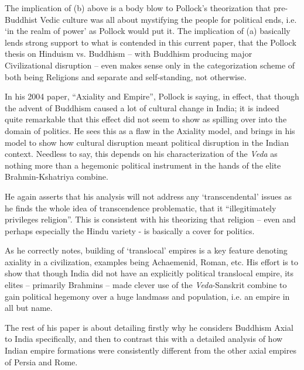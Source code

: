 The implication of (b) above is a body blow to Pollock’s theorization that pre-Buddhist Vedic culture was all about mystifying the people for political ends, i.e. ‘in the realm of power’ as Pollock would put it. The implication of (a) basically lends strong support to what is contended in this current paper, that the Pollock thesis on Hinduism vs. Buddhism – with Buddhism producing major Civilizational disruption – even makes sense only in the categorization scheme of both being Religions and separate and self-standing, not otherwise.

In his 2004 paper, “Axiality and Empire”, Pollock is saying, in effect, that though the advent of Buddhism caused a lot of cultural change in India; it is indeed quite remarkable that this effect did not seem to show as spilling over into the domain of politics. He sees this as a flaw in the Axiality model, and brings in his model to show how cultural disruption meant political disruption in the Indian context. Needless to say, this depends on his characterization of the \textit{Veda} as nothing more than a hegemonic political instrument in the hands of the elite Brahmin-Kshatriya combine.

He again asserts that his analysis will not address any ‘transcendental’ issues as he finds the whole idea of transcendence problematic, that it “illegitimately privileges religion”. This is consistent with his theorizing that religion – even and perhaps especially the Hindu variety - is basically a cover for politics.

As he correctly notes, building of ‘translocal’ empires is a key feature denoting axiality in a civilization, examples being Achaemenid, Roman, etc. His effort is to show that though India did not have an explicitly political translocal empire, its elites – primarily Brahmins – made clever use of the \textit{Veda}-Sanskrit combine to gain political hegemony over a huge landmass and population, i.e. an empire in all but name.

The rest of his paper is about detailing firstly why he considers Buddhism Axial to India specifically, and then to contrast this with a detailed analysis of how Indian empire formations were consistently different from the other axial empires of Persia and Rome.

\vspace{.1cm}

